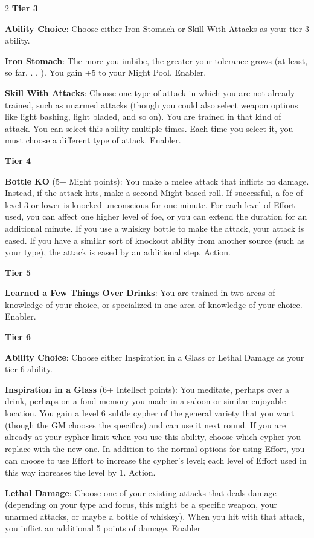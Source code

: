 \begin{multicols}{2}
\textbf{Tier 3}
 
\textbf{Ability Choice}: Choose either Iron Stomach or Skill With Attacks as your tier 3 ability. 

\textbf{Iron Stomach}: The more you imbibe, the greater your tolerance grows (at least, so far. . . ). You gain +5 to your Might Pool. Enabler. 

\textbf{Skill With Attacks}: Choose one type of attack in which you are not already trained, such as unarmed attacks (though you could also select weapon options like light bashing, light bladed, and so on). You are trained in that kind of attack. You can select this ability multiple times. Each time you select it, you must choose a different type of attack. Enabler. 

\textbf{Tier 4}
 
\textbf{Bottle KO} (5+ Might points): You make a melee attack that inflicts no damage. Instead, if the attack hits, make a second Might-based roll. If successful, a foe of level 3 or lower is knocked unconscious for one minute. For each level of Effort used, you can affect one higher level of foe, or you can extend the duration for an additional minute. If you use a whiskey bottle to make the attack, your attack is eased. If you have a similar sort of knockout ability from another source (such as your type), the attack is eased by an additional step. Action. 

\textbf{Tier 5}
 
\textbf{Learned a Few Things Over Drinks}: You are trained in two areas of knowledge of your choice, or specialized in one area of knowledge of your choice. Enabler. 

\textbf{Tier 6}
 
\textbf{Ability Choice}: Choose either Inspiration in a Glass or Lethal Damage as your tier 6 ability. 

\textbf{Inspiration in a Glass} (6+ Intellect points): You meditate, perhaps over a drink, perhaps on a fond memory you made in a saloon or similar enjoyable location. You gain a level 6 subtle cypher of the general variety that you want (though the GM chooses the specifics) and can use it next round. If you are already at your cypher limit when you use this ability, choose which cypher you replace with the new one. In addition to the normal options for using Effort, you can choose to use Effort to increase the cypher’s level; each level of Effort used in this way increases the level by 1. Action. 

\textbf{Lethal Damage}: Choose one of your existing attacks that deals damage (depending on your type and focus, this might be a specific weapon, your unarmed attacks, or maybe a bottle of whiskey). When you hit with that attack, you inflict an additional 5 points of damage. Enabler 


\end{multicols}
